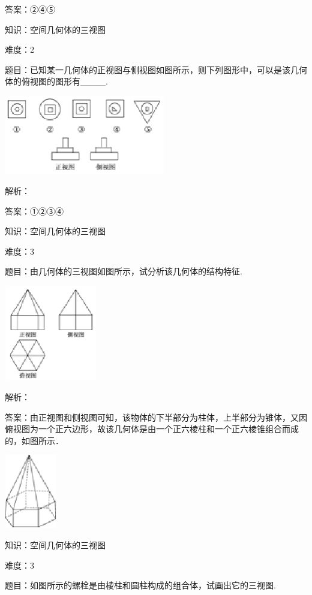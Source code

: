 \documentclass{article} %
\begin{document}
答案：②④⑤

知识：空间几何体的三视图

难度：2

题目：已知某一几何体的正视图与侧视图如图所示，则下列图形中，可以是该几何体的俯视图的图形有\_\_\_\_.

\includegraphics*[width=2.77in, height=1.36in, keepaspectratio=false]{image42}

解析：

答案：①②③④

知识：空间几何体的三视图

难度：3

题目：由几何体的三视图如图所示，试分析该几何体的结构特征.

\includegraphics*[width=1.59in, height=1.64in, keepaspectratio=false]{image43}

解析：

答案：由正视图和侧视图可知，该物体的下半部分为柱体，上半部分为锥体，又因俯视图为一个正六边形，故该几何体是由一个正六棱柱和一个正六棱锥组合而成的，如图所示．

\includegraphics*[width=0.90in, height=1.27in, keepaspectratio=false]{image44}

知识：空间几何体的三视图

难度：3

题目：如图所示的螺栓是由棱柱和圆柱构成的组合体，试画出它的三视图.
\end{document}
